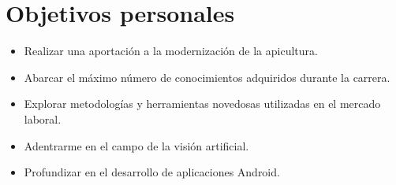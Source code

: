 \section{Objetivos personales}\label{objetivos-personales}

\begin{itemize}
\tightlist
\item
  Realizar una aportación a la modernización de la apicultura.
\item
  Abarcar el máximo número de conocimientos adquiridos durante la
  carrera.
\item
  Explorar metodologías y herramientas novedosas utilizadas en el
  mercado laboral.
\item
  Adentrarme en el campo de la visión artificial.
\item
  Profundizar en el desarrollo de aplicaciones Android.
\end{itemize}
